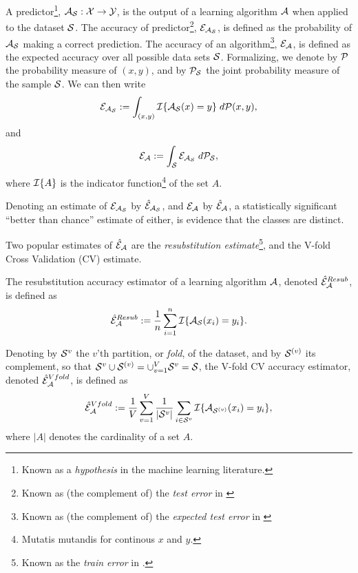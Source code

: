 \documentclass[12pt,a4paper]{article}
\begin{document}
A predictor\footnote{Known as a \emph{hypothesis} in the machine learning literature.}, $\mathcal{A}_{\mathcal{S}}:\mathcal{X} \to \mathcal{Y}$, is the output of a learning algorithm $\mathcal{A}$ when applied to the dataset $\mathcal{S}$. 
The accuracy of predictor\footnote{Known as (the complement of) the \emph{test error} in \cite{hastie_elements_2003}}, $\mathcal{E}_{\mathcal{A}_{\mathcal{S}}}$, is defined as the probability of $\mathcal{A}_{\mathcal{S}}$ making a correct prediction. 
The accuracy of an algorithm\footnote{Known as (the complement of) the \emph{expected test error} in \cite{hastie_elements_2003}}, $\mathcal{E}_{\mathcal{A}}$, is defined as the expected accuracy over all possible data sets $\mathcal{S}$. 
Formalizing, we denote by $\mathcal{P}$ the probability measure of $(x, y)$, and by $\mathcal{P}_{\mathcal{S}}$ the joint probability measure of the sample $\mathcal{S}$. 
We can then write 
\begin{align}
	\mathcal{E}_{\mathcal{A}_{\mathcal{S}}}:=\int_{(x,y)} \mathcal{I}{\{ \mathcal{A}_{\mathcal{S}}(x)=y \}} \; d\mathcal{P}(x,y),
\end{align}
and
\begin{align}
	\mathcal{E}_{\mathcal{A}}:=\int_{\mathcal{S}} \mathcal{E}_{\mathcal{A}_{\mathcal{S}}} \; d\mathcal{P}_{\mathcal{S}},
\end{align}
where $\mathcal{I}{\{ A \}}$ is the indicator function\footnote{Mutatis mutandis for continous $x$ and $y$.} of the set $A$. 

Denoting an estimate of $\mathcal{E}_{\mathcal{A}_{\mathcal{S}}}$ by $\hat{\mathcal{E}}_{\mathcal{A}_{\mathcal{S}}}$, and $\mathcal{E}_{\mathcal{A}}$ by $\hat{\mathcal{E}}_{\mathcal{A}}$, a statistically significant ``better than chance'' estimate of either, is evidence that the classes are distinct. 

Two popular estimates of $\hat{\mathcal{E}}_{\mathcal{A}}$ are the \emph{resubstitution estimate}\footnote{Known as the \emph{train error} in \cite{hastie_elements_2003}.}, and the V-fold Cross Validation (CV) estimate.
\begin{definition}
\label{def:resubstitution}
The resubstitution accuracy estimator of a learning algorithm $\mathcal{A}$, denoted $\hat{\mathcal{E}}_{\mathcal{A}}^{Resub}$,  is defined as
\begin{align}
	\hat{\mathcal{E}}_{\mathcal{A}}^{Resub} := \frac 1n \sum_{i=1}^{n} \mathcal{I}{\{ \mathcal{A}_{\mathcal{S}}(x_i)=y_i \}}.
\end{align}
\end{definition}


\begin{definition}
\label{def:v-fold}
Denoting by $\mathcal{S}^{v}$ the $v$'th partition, or \emph{fold}, of the dataset, and by $\mathcal{S}^{(v)}$ its complement, so that $\mathcal{S}^{v} \cup \mathcal{S}^{(v)}=\cup_{v=1}^V \mathcal{S}^{v}=\mathcal{S}$, the V-fold CV accuracy estimator, denoted $\hat{\mathcal{E}}_{\mathcal{A}}^{Vfold}$, is defined as 	
\begin{align}
	\hat{\mathcal{E}}_{\mathcal{A}}^{Vfold} := 
	\frac 1V \sum_{v=1}^{V} \frac{1}{|\mathcal{S}^v|} \sum_{i \in \mathcal{S}^{v}} \mathcal{I}{\{ \mathcal{A}_{\mathcal{S}^{(v)}}(x_i)=y_i \}},
\end{align}
where $|A|$ denotes the cardinality of a set $A$.
\end{definition}
\end{document}
